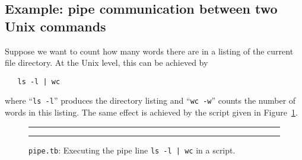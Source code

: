\subsection{\label{Ex-pipe}Example: pipe communication between two Unix commands}
Suppose we want to count how many words there are in a listing of the
current file directory. At the Unix level, this can be achieved by
\begin{verbatim}
   ls -l | wc
\end{verbatim}
where ``{\tt ls -l}'' produces the directory listing and
``{\tt wc -w}'' counts the number of words in this listing.
The same effect is achieved by the script given in Figure~\ref{fig:pipe.tb}.

\begin{figure}
\rule{\textwidth}{0.5mm}

  \caption{{\tt pipe.tb}: Executing the pipe line {\tt ls -l | wc} in a script.}
  \label{fig:pipe.tb}
\rule{\textwidth}{0.5mm}
\end{figure}
